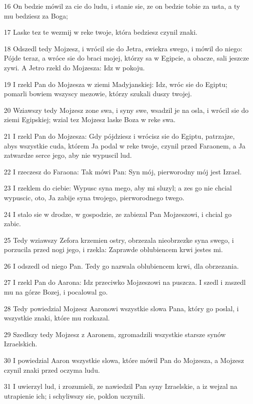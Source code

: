 \par 16 On bedzie mówil za cie do ludu, i stanie sie, ze on bedzie tobie za usta, a ty mu bedziesz za Boga;
\par 17 Laske tez te wezmij w reke twoje, która bedziesz czynil znaki.
\par 18 Odszedl tedy Mojzesz, i wrócil sie do Jetra, swiekra swego, i mówil do niego: Pójde teraz, a wróce sie do braci mojej, którzy sa w Egipcie, a obacze, sali jeszcze zywi. A Jetro rzekl do Mojzesza: Idz w pokoju.
\par 19 I rzekl Pan do Mojzesza w ziemi Madyjanskiej: Idz, wróc sie do Egiptu; pomarli bowiem wszyscy mezowie, którzy szukali duszy twojej.
\par 20 Wziawszy tedy Mojzesz zone swa, i syny swe, wsadzil je na osla, i wrócil sie do ziemi Egipskiej; wzial tez Mojzesz laske Boza w reke swa.
\par 21 I rzekl Pan do Mojzesza: Gdy pójdziesz i wrócisz sie do Egiptu, patrzajze, abys wszystkie cuda, którem Ja podal w reke twoje, czynil przed Faraonem, a Ja zatwardze serce jego, aby nie wypuscil lud.
\par 22 I rzeczesz do Faraona: Tak mówi Pan: Syn mój, pierworodny mój jest Izrael.
\par 23 I rzeklem do ciebie: Wypusc syna mego, aby mi sluzyl; a zes go nie chcial wypuscic, oto, Ja zabije syna twojego, pierworodnego twego.
\par 24 I stalo sie w drodze, w gospodzie, ze zabiezal Pan Mojzeszowi, i chcial go zabic.
\par 25 Tedy wziawszy Zefora krzemien ostry, obrzezala nieobrzezke syna swego, i porzucila przed nogi jego, i rzekla: Zaprawde oblubiencem krwi jestes mi.
\par 26 I odszedl od niego Pan. Tedy go nazwala oblubiencem krwi, dla obrzezania.
\par 27 I rzekl Pan do Aarona: Idz przeciwko Mojzeszowi na puszcza. I szedl i zaszedl mu na górze Bozej, i pocalowal go.
\par 28 Tedy powiedzial Mojzesz Aaronowi wszystkie slowa Pana, który go poslal, i wszystkie znaki, które mu rozkazal.
\par 29 Szedlszy tedy Mojzesz z Aaronem, zgromadzili wszystkie starsze synów Izraelskich.
\par 30 I powiedzial Aaron wszystkie slowa, które mówil Pan do Mojzesza, a Mojzesz czynil znaki przed oczyma ludu.
\par 31 I uwierzyl lud, i zrozumieli, ze nawiedzil Pan syny Izraelskie, a iz wejzal na utrapienie ich; i schyliwszy sie, poklon uczynili.

